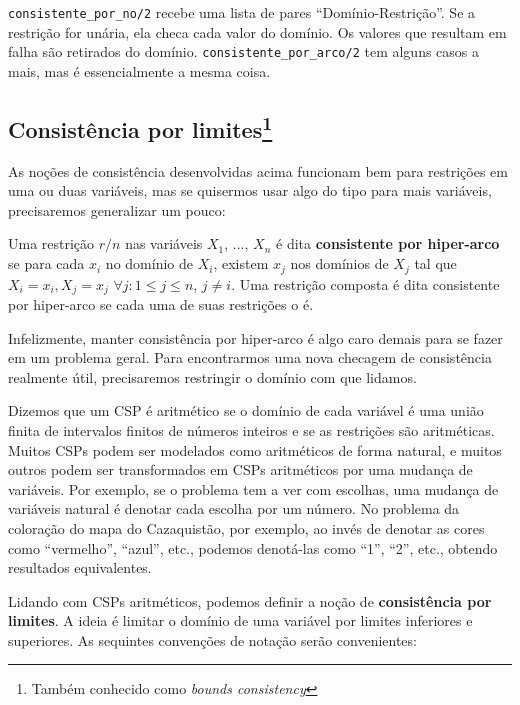 \documentclass{article}
\begin{document}
\label{lst:arc_consistency}

{\tt consistente\_por\_no/2} recebe uma lista de pares ``Domínio-Restrição''. Se a restrição for unária, ela checa cada valor do domínio.
Os valores que resultam em falha são retirados do domínio. {\tt consistente\_por\_arco/2} tem alguns casos a mais, mas é essencialmente a mesma coisa.

\subsection{Consistência por limites\footnote{Também conhecido como \textit{bounds consistency}}}

As noções de consistência desenvolvidas acima funcionam bem para restrições em uma ou duas variáveis,
mas se quisermos usar algo do tipo para mais variáveis, precisaremos generalizar um pouco:

\begin{definition}
  Uma restrição $r/n$ nas variáveis $X_1$, ..., $X_n$ é dita \textbf{consistente por hiper-arco}
  se para cada $x_i$ no domínio de $X_i$, existem $x_j$ nos domínios de $X_j$ tal que
  $X_i = x_i, X_j = x_j$  $\forall j: 1 \leq j \leq n$, $j \neq i$.
  Uma restrição composta é dita consistente por hiper-arco se cada uma de suas restrições o é.
\end{definition}

Infelizmente, manter consistência por hiper-arco é algo caro demais para se fazer em um problema geral. Para
encontrarmos uma nova checagem de consistência realmente útil, precisaremos restringir o domínio com que lidamos.

Dizemos que um CSP é aritmético se o domínio de cada variável é uma união
finita de intervalos finitos de números inteiros e se as restrições são aritméticas. Muitos CSPs podem ser modelados como aritméticos de forma natural, e muitos outros podem ser transformados em CSPs aritméticos por uma mudança de variáveis.
Por exemplo, se o problema tem a ver com escolhas, uma mudança de variáveis natural é denotar cada escolha por um número. No problema da
coloração do mapa do Cazaquistão, por exemplo, ao invés de denotar as cores como ``vermelho'', ``azul'', etc., podemos denotá-las como ``1'', ``2'', etc., obtendo resultados equivalentes.

Lidando com CSPs aritméticos, podemos definir a noção de \textbf{consistência por limites}. A ideia é limitar o domínio
de uma variável por limites inferiores e superiores. As sequintes convenções de notação serão convenientes:
\end{document}
